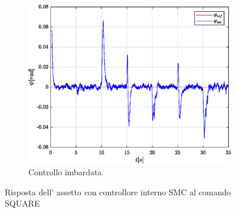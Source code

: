 \begin{figure}
	\hfill
	\begin{subfigure}{0.45\textwidth}
		\centering
		\includegraphics[width=1\textwidth]{Simulazioni/Figure/SMC/SQUARE/AttitudeControlYaw}
		\caption{Controllo imbardata}
		\label{fig:SQUAREyawSMC}
	\end{subfigure}
	\caption{Risposta dell' assetto con controllore interno SMC al comando SQUARE}
\end{figure}



